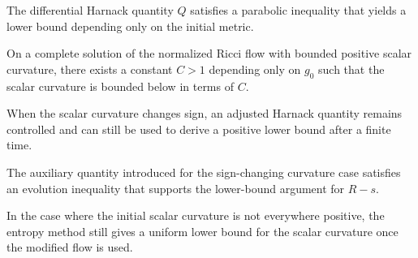 \begin{corollary}
\label{ch05-cor-differential-harnack}

The differential Harnack quantity \(Q\) satisfies a parabolic inequality that yields a lower bound depending only on the initial metric.
\end{corollary}

\begin{proposition}
\label{ch05-prop-positive-curvature-lower-bound}

On a complete solution of the normalized Ricci flow with bounded positive scalar curvature, there exists a constant \(C>1\) depending only on \(g_0\) such that the scalar curvature is bounded below in terms of \(C\).
\end{proposition}

\begin{proposition}
\label{ch05-prop-modified-harnack-control}

When the scalar curvature changes sign, an adjusted Harnack quantity remains controlled and can still be used to derive a positive lower bound after a finite time.
\end{proposition}

\begin{lemma}
\label{ch05-lem-aux-lower-bound}

The auxiliary quantity introduced for the sign-changing curvature case satisfies an evolution inequality that supports the lower-bound argument for \(R-s\).
\end{lemma}

\begin{proposition}
\label{ch05-prop-entropy-lower-bound-sign-changing}

In the case where the initial scalar curvature is not everywhere positive, the entropy method still gives a uniform lower bound for the scalar curvature once the modified flow is used.
\end{proposition}

